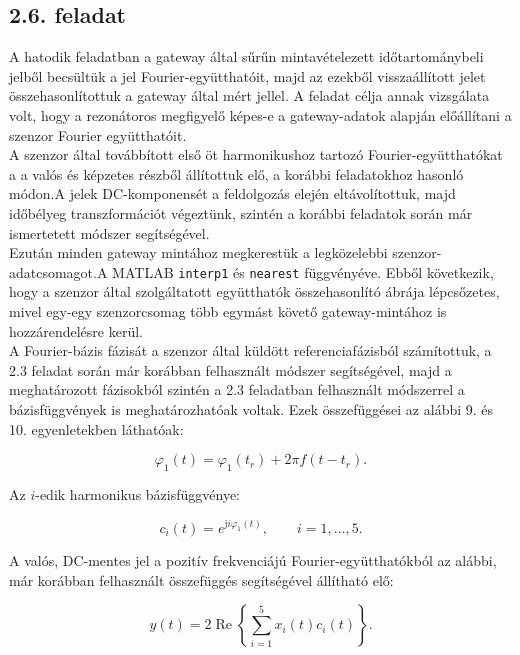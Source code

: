 \documentclass[12pt,a4paper]{article}
\newcommand{\feladat}[1]{%
\phantomsection
\subsection*{#1. feladat}%
\addcontentsline{toc}{subsection}{#1. feladat}%
}
\begin{document}
\feladat{2.6}

A hatodik feladatban a gateway által sűrűn mintavételezett időtartománybeli
jelből becsültük a jel Fourier-együtthatóit, majd az ezekből visszaállított
jelet összehasonlítottuk a gateway által mért jellel. A feladat
célja annak vizsgálata volt, hogy a rezonátoros megfigyelő képes-e a
gateway-adatok alapján előállítani a szenzor Fourier együtthatóit.\\

A szenzor által továbbított első öt harmonikushoz tartozó Fourier-együtthatókat a a valós és képzetes részből állítottuk elő, a korábbi feladatokhoz hasonló módon.A
jelek DC-komponensét a feldolgozás elején eltávolítottuk, majd időbélyeg transzformációt végeztünk, szintén a korábbi feladatok során már ismertetett módszer segítségével.\\

Ezután minden gateway mintához megkerestük a legközelebbi szenzor-adatcsomagot.A MATLAB \texttt{interp1} és \texttt{nearest} függvényéve. Ebből következik, hogy a szenzor által szolgáltatott együtthatók összehasonlító ábrája lépcsőzetes, mivel egy-egy szenzorcsomag több
egymást követő gateway-mintához is hozzárendelésre kerül.\\

A Fourier-bázis fázisát a szenzor által küldött referenciafázisból
számítottuk, a 2.3 feladat során már korábban felhasznált módszer segítségével, majd a meghatározott fázisokból szintén a 2.3 feladatban felhasznált módszerrel a bázisfüggvények is meghatározhatóak voltak. Ezek összefüggései az alábbi 9. és 10. egyenletekben láthatóak:


\begin{equation}
\varphi_1(t)
=
\varphi_1(t_r)+2\pi f(t-t_r).
\end{equation}

Az \(i\)-edik harmonikus bázisfüggvénye:

\begin{equation}
c_i(t)=e^{\mathrm{j}i\varphi_1(t)},
\qquad i=1,\ldots,5.
\end{equation}

A valós, DC-mentes jel a pozitív frekvenciájú Fourier-együtthatókból az
alábbi, már korábban felhasznált összefüggés segítségével állítható elő:

\begin{equation}
y(t)
=
2\operatorname{Re}
\left\{
\sum_{i=1}^{5}x_i(t)c_i(t)
\right\}.
\end{equation}
\end{document}
